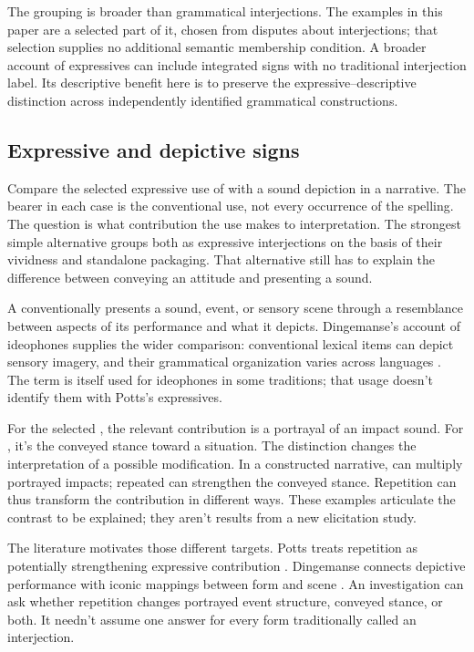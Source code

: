 \documentclass[12pt]{article}
\begin{document}
The grouping is broader than grammatical interjections. The examples in
this paper are a selected part of it, chosen from disputes about
interjections; that selection supplies no additional semantic membership
condition. A broader account of expressives can include integrated signs
with no traditional interjection label. Its descriptive benefit here is
to preserve the expressive--descriptive distinction across independently
identified grammatical constructions.

\subsection{Expressive and depictive signs}\label{sec:expressive-depictive}

Compare the selected expressive use of  with a sound depiction
 in a narrative. The bearer in each case is the conventional
use, not every occurrence of the spelling. The question is what contribution
the use makes to interpretation. The strongest simple alternative groups
both as expressive interjections on the basis of their vividness and
standalone packaging. That alternative still has to explain the difference
between conveying an attitude and presenting a sound.

A  conventionally presents a sound, event, or sensory
scene through a resemblance between aspects of its performance and what
it depicts. Dingemanse's account of ideophones supplies the wider comparison:
conventional lexical items can depict sensory imagery, and their grammatical
organization varies across languages \citep[2--3]{dingemanse2018}.
The term  is itself used for ideophones in some traditions;
that usage doesn't identify them with Potts's expressives.

For the selected , the relevant contribution is a portrayal
of an impact sound. For , it's the conveyed stance toward
a situation. The distinction changes the interpretation of a possible
modification. In a constructed narrative,  can
multiply portrayed impacts; repeated  can strengthen the
conveyed stance. Repetition can thus transform the contribution in
different ways. These examples articulate the contrast to be explained;
they aren't results from a new elicitation study.

The literature motivates those different targets. Potts treats repetition
as potentially strengthening expressive contribution \citep[181--182]{potts2007}.
Dingemanse connects depictive performance with iconic mappings between
form and scene \citep[10--11]{dingemanse2018}. An investigation can
ask whether repetition changes portrayed event structure, conveyed stance,
or both. It needn't assume one answer for every form traditionally
called an interjection.
\end{document}
